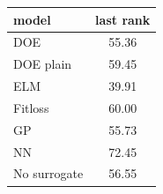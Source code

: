 \begin{tabular}{|lc|}
\hline
model & last rank\\
\hline
DOE & 55.36 \\
DOE plain & 59.45 \\
ELM & 39.91 \\
Fitloss & 60.00 \\
GP & 55.73 \\
NN & 72.45 \\
No surrogate & 56.55 \\
\hline
\end{tabular}
